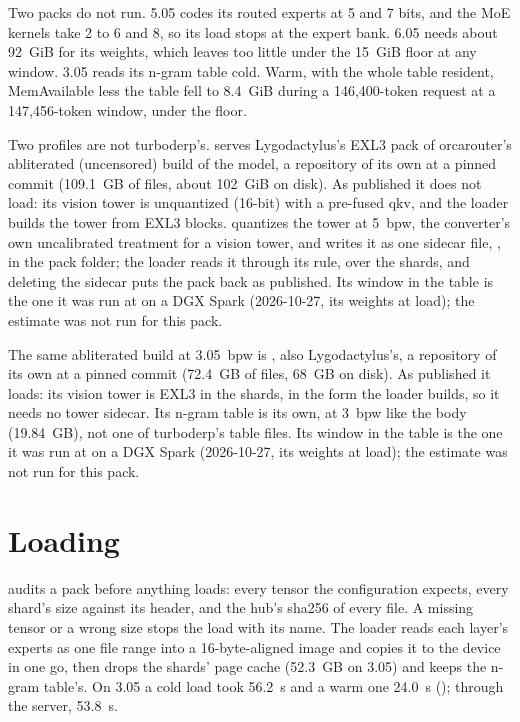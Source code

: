 Two packs do not run. 5.05 codes its routed experts at 5 and 7 bits, and the MoE kernels take 2 to 6 and 8, so its load stops at the expert bank. 6.05 needs about 92~GiB for its weights, which leaves too little under the 15~GiB floor at any window. 3.05 reads its n-gram table cold. Warm, with the whole table resident, MemAvailable less the table fell to 8.4~GiB during a 146,400-token request at a 147,456-token window, under the floor.

Two profiles are not turboderp's.  serves Lygodactylus's EXL3 pack of orcarouter's abliterated (uncensored) build of the model, a repository of its own at a pinned commit (109.1~GB of files, about 102~GiB on disk). As published it does not load: its vision tower is unquantized (16-bit) with a pre-fused qkv, and the loader builds the tower from EXL3 blocks.  quantizes the tower at 5~bpw, the converter's own uncalibrated treatment for a vision tower, and writes it as one sidecar file, , in the pack folder; the loader reads it through its  rule, over the shards, and deleting the sidecar puts the pack back as published. Its window in the table is the one it was run at on a DGX Spark (2026-10-27, its weights \measured{} at load); the estimate was not run for this pack.

The same abliterated build at 3.05~bpw is , also Lygodactylus's, a repository of its own at a pinned commit (72.4~GB of files, 68~GB on disk). As published it loads: its vision tower is EXL3 in the shards, in the form the loader builds, so it needs no tower sidecar. Its n-gram table is its own, at 3~bpw like the body (19.84~GB), not one of turboderp's table files. Its window in the table is the one it was run at on a DGX Spark (2026-10-27, its weights \measured{} at load); the estimate was not run for this pack.

\section{Loading}

 audits a pack before anything loads: every tensor the configuration expects, every shard's size against its header, and the hub's sha256 of every file. A missing tensor or a wrong size stops the load with its name. The loader reads each layer's experts as one file range into a 16-byte-aligned image and copies it to the device in one go, then drops the shards' page cache (52.3~GB on 3.05) and keeps the n-gram table's. On 3.05 a cold load took 56.2~s and a warm one 24.0~s (\measured); through the server, 53.8~s.

